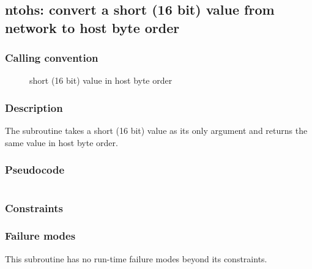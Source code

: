 \clearpage
{}
{}
\label{subr:ntohs}
\subsection*{ntohs: convert a short (16 bit) value from network to
  host byte order}

\subsubsection*{Calling convention}

\begin{description}
\item[] short (16 bit) value in host byte order
\end{description}

\subsubsection*{Description}

The  subroutine takes a short (16 bit) value as its
only argument and returns the same value in host byte order.

\subsubsection*{Pseudocode}

\begin{verbatim}
\end{verbatim}

\subsubsection*{Constraints}

\subsubsection*{Failure modes}

This subroutine has no run-time failure modes beyond its constraints.
